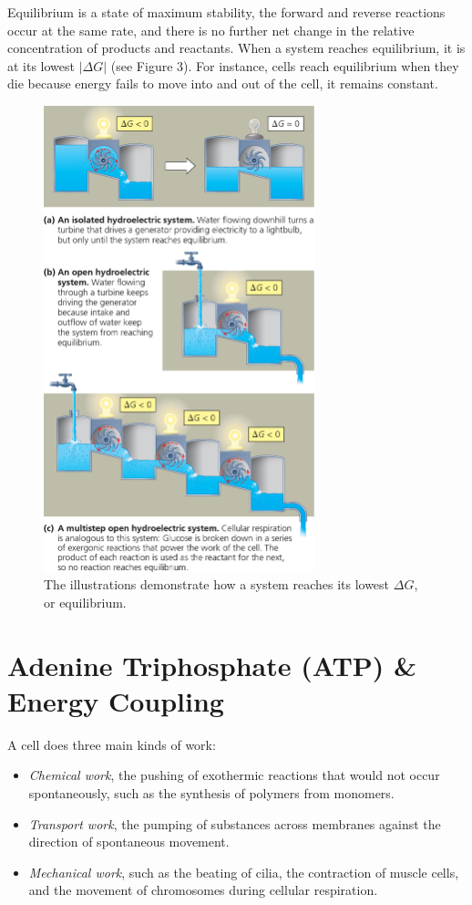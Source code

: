 \documentclass[a4paper]{article}
\begin{document}
\color{red}Equilibrium \color{black} is a state of maximum stability, the forward and reverse reactions occur at the same rate, and there is no further net change in the relative concentration of products and reactants. When a system reaches equilibrium, it is at its lowest $|\Delta G|$ (see Figure 3). For instance, cells reach equilibrium when they die because energy fails to move into and out of the cell, it remains constant.

\begin{figure}[h!]
\centering
\includegraphics[width=0.7\textwidth]{figure_three.jpeg}
\caption{The illustrations demonstrate how a system reaches its lowest $\Delta G$, or equilibrium.}
\end{figure}

\section{Adenine Triphosphate (ATP) \& Energy Coupling}
A cell does three main kinds of work:
\begin{itemize}
	\item \textit{Chemical work}, the pushing of exothermic reactions that would not occur spontaneously, such as the synthesis of polymers from monomers.
	\item \textit{Transport work}, the pumping of substances across membranes against the direction of spontaneous movement.
	\item \textit{Mechanical work}, such as the beating of cilia, the contraction of muscle cells, and the movement of chromosomes during cellular respiration.
\end{itemize}
\end{document}
